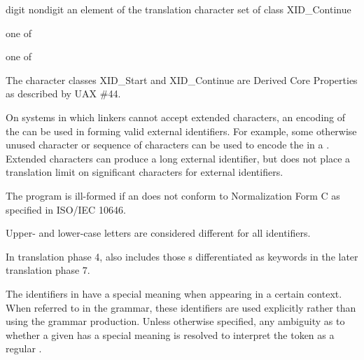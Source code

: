 \begin{bnf}
\br
    digit\br
    nondigit\br
    \textnormal{an element of the translation character set of class XID_Continue}
\end{bnf}

\begin{bnf}
 \textnormal{one of}\br
    \br
    \br
    \br
\end{bnf}

\begin{bnf}
 \textnormal{one of}\br
\end{bnf}

\pnum
{}%
%
The character classes XID_Start and XID_Continue
are Derived Core Properties as described by UAX \#44.
\begin{footnote}
On systems in which linkers cannot accept extended
characters, an encoding of the  can be used in
forming valid external identifiers. For example, some otherwise unused
character or sequence of characters can be used to encode the
 in a . Extended
characters can produce a long external identifier, but \Cpp{} does not
place a translation limit on significant characters for external
identifiers.
\end{footnote}
The program is ill-formed
if an  does not conform to
Normalization Form C as specified in ISO/IEC 10646.
\begin{note}
Upper- and lower-case letters are considered different for all identifiers.
\end{note}
\begin{note}
In translation phase 4,
 also includes
those s
differentiated as keywords
in the later translation phase 7.
\end{note}

\pnum
{}%
%
%
%
The identifiers in  have a special meaning when
appearing in a certain context. When referred to in the grammar, these identifiers
are used explicitly rather than using the  grammar production.
Unless otherwise specified, any ambiguity as to whether a given
 has a special meaning is resolved to interpret the
token as a regular .

